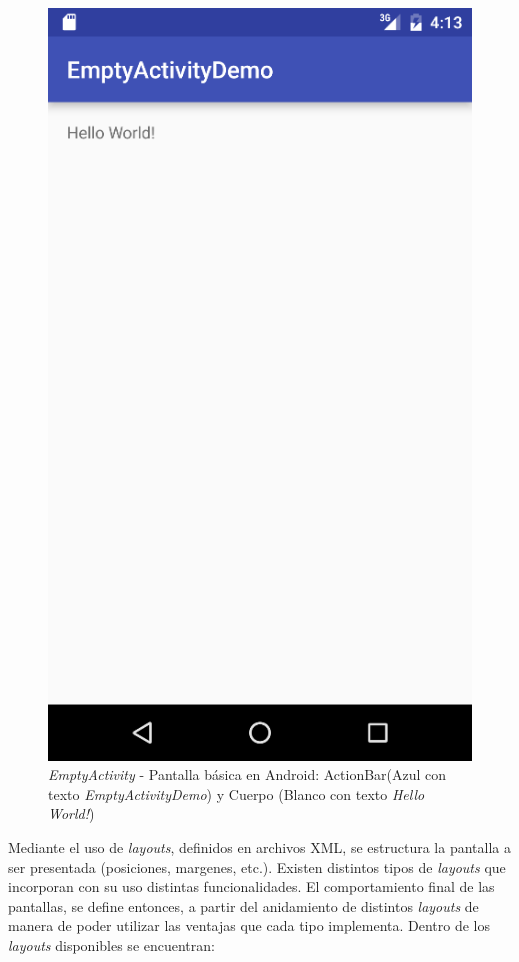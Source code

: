     \begin{figure}
        \centering
        \includegraphics[scale=0.5]{software/EmptyActivity.jpg}
        \caption{\textit{EmptyActivity} - Pantalla básica en Android: ActionBar(Azul con texto \textit{EmptyActivityDemo}) y Cuerpo (Blanco con texto \textit{Hello World!})}
        \label{fig:emptyActivity}
    \end{figure}
    
    \par Mediante el uso de \textit{layouts}, definidos en archivos XML, se estructura la pantalla a ser presentada (posiciones, margenes, etc.). Existen distintos tipos de \textit{layouts} que incorporan con su uso distintas funcionalidades. El comportamiento final de las pantallas, se define entonces, a partir del anidamiento de distintos \textit{layouts} de manera de poder utilizar las ventajas que cada tipo implementa. Dentro de los \textit{layouts} disponibles se encuentran:
    
